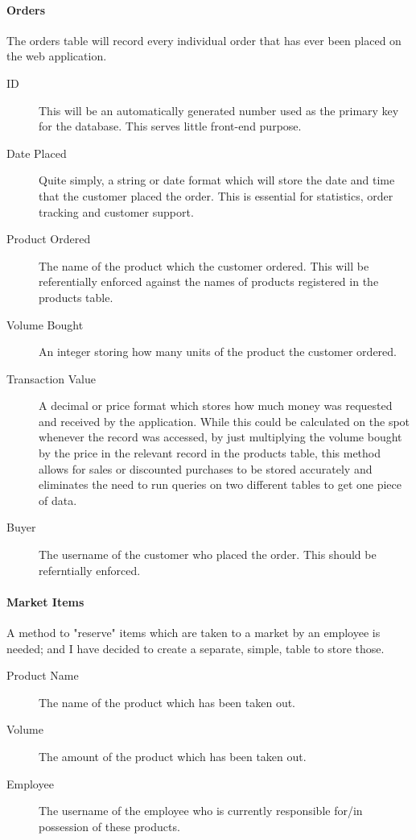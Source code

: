 ﻿\documentclass{article}
\begin{document}
    \paragraph{Orders}
    The orders table will record every individual order that has ever been placed on the web application.
    \begin{description}
        \item[ID] This will be an automatically generated number used as the primary key for the database.
        This serves little front-end purpose.
        \item[Date Placed] Quite simply, a string or date format which will store the date and time that the customer placed the order.
        This is essential for statistics, order tracking and customer support.
        \item[Product Ordered] The name of the product which the customer ordered.
        This will be referentially enforced against the names of products registered in the products table.
        \item[Volume Bought] An integer storing how many units of the product the customer ordered.
        \item[Transaction Value] A decimal or price format which stores how much money was requested and received by the application.
        While this could be calculated on the spot whenever the record was accessed, by just multiplying the volume bought by the price in the relevant record in the products table, this method allows for sales or discounted purchases to be stored accurately and eliminates the need to run queries on two different tables to get one piece of data.
        \item[Buyer] The username of the customer who placed the order.
        This should be referntially enforced.
    \end{description}
    \paragraph{Market Items}
    A method to "reserve" items which are taken to a market by an employee is needed; and I have decided to create a separate, simple, table to store those.
    \begin{description}
        \item[Product Name] The name of the product which has been taken out.
        \item[Volume] The amount of the product which has been taken out.
        \item[Employee] The username of the employee who is currently responsible for/in possession of these products.
    \end{description}
    \newpage
\end{document}
